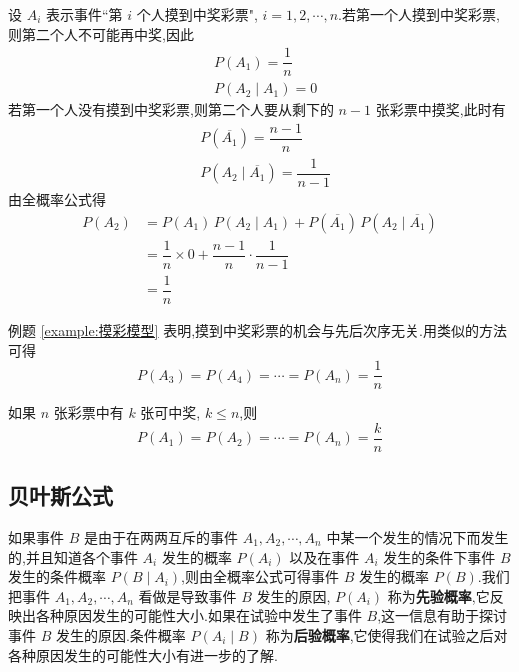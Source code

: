 \begin{solution}
    设 $A_i$ 表示事件``第 $i$ 个人摸到中奖彩票", $i=1,2,\cdots,n$.若第一个人摸到中奖彩票,则第二个人不可能再中奖,因此
    $$
    \begin{aligned}
        & P(A_1) = \dfrac{1}{n} \\
        & P(A_2 \mid A_1) = 0
    \end{aligned}
    $$
    若第一个人没有摸到中奖彩票,则第二个人要从剩下的 $n-1$ 张彩票中摸奖,此时有
    $$
    \begin{aligned}
        & P(\overline{A_1}) = \dfrac{n-1}{n} \\
        & P(A_2 \mid \overline{A_1}) = \dfrac{1}{n-1}
    \end{aligned}
    $$
    由全概率公式得
    $$
    \begin{aligned}
        P(A_2) &= P(A_1) \, P(A_2 \mid A_1) + P(\overline{A_1}) \, P(A_2 \mid \overline{A_1}) \\
        &= \dfrac{1}{n} \times 0 + \dfrac{n-1}{n} \cdot \dfrac{1}{n-1} \\
        &= \dfrac{1}{n}
    \end{aligned}
    $$
\end{solution}

\begin{note}
    \indent 例题 \ref{example:摸彩模型} 表明,摸到中奖彩票的机会与先后次序无关.用类似的方法可得
    $$
    P(A_3) = P(A_4) = \cdots = P(A_n) = \dfrac{1}{n}
    $$
    
    如果 $n$ 张彩票中有 $k$ 张可中奖, $k \leqslant n$,则
    $$
    P(A_1) = P(A_2) = \cdots = P(A_n) = \dfrac{k}{n}
    $$
\end{note}

\subsection{贝叶斯公式}

如果事件 $B$ 是由于在两两互斥的事件 $A_1,A_2,\cdots,A_n$ 中某一个发生的情况下而发生的,并且知道各个事件 $A_i$ 发生的概率 $P(A_i)$ 以及在事件 $A_i$ 发生的条件下事件 $B$ 发生的条件概率 $P(B \mid A_i)$,则由全概率公式可得事件 $B$ 发生的概率 $P(B)$.我们把事件 $A_1,A_2,\cdots,A_n$ 看做是导致事件 $B$ 发生的原因, $P(A_i)$ 称为\textbf{先验概率},它反映出各种原因发生的可能性大小.如果在试验中发生了事件 $B$,这一信息有助于探讨事件 $B$ 发生的原因.条件概率 $P(A_i \mid B)$ 称为\textbf{后验概率},它使得我们在试验之后对各种原因发生的可能性大小有进一步的了解.

